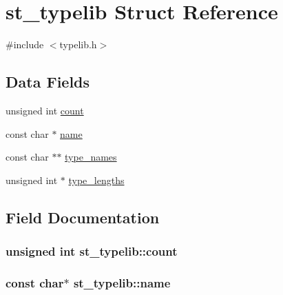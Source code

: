 \hypertarget{structst__typelib}{}\section{st\+\_\+typelib Struct Reference}
\label{structst__typelib}


{\ttfamily \#include $<$typelib.\+h$>$}

\subsection*{Data Fields}
\begin{DoxyCompactItemize}
\item 
unsigned int \hyperlink{structst__typelib_a1ff58f79cb3420219f1604aa3ee8676f}{count}
\item 
const char $\ast$ \hyperlink{structst__typelib_aa5287a9b7e6529086998a0587ed1e368}{name}
\item 
const char $\ast$$\ast$ \hyperlink{structst__typelib_a34213db673ed358a00b1f11d86c477f7}{type\+\_\+names}
\item 
unsigned int $\ast$ \hyperlink{structst__typelib_ae5755c42d2adb8746990c5dc6f1fca56}{type\+\_\+lengths}
\end{DoxyCompactItemize}


\subsection{Field Documentation}
\hypertarget{structst__typelib_a1ff58f79cb3420219f1604aa3ee8676f}{}
\subsubsection[{count}]{\setlength{\rightskip}{0pt plus 5cm}unsigned int st\+\_\+typelib\+::count}\label{structst__typelib_a1ff58f79cb3420219f1604aa3ee8676f}
\hypertarget{structst__typelib_aa5287a9b7e6529086998a0587ed1e368}{}
\subsubsection[{name}]{\setlength{\rightskip}{0pt plus 5cm}const char$\ast$ st\+\_\+typelib\+::name}\label{structst__typelib_aa5287a9b7e6529086998a0587ed1e368}
\hypertarget{structst__typelib_ae5755c42d2adb8746990c5dc6f1fca56}{}
